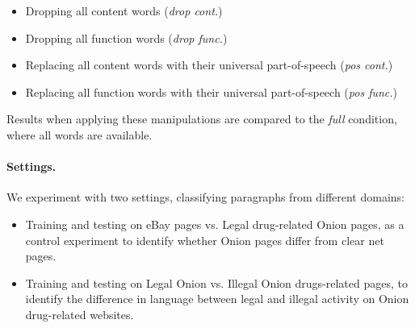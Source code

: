 \documentclass[11pt,a4paper,table]{article}
\begin{document}
\begin{itemize}
  \item Dropping all content words ({\it drop cont.})
  \item Dropping all function words ({\it drop func.})
  \item Replacing all content words with their universal part-of-speech ({\it pos cont.})
  \item Replacing all function words with their universal part-of-speech ({\it pos func.})
\end{itemize}

Results when applying these manipulations are compared to the {\it full} condition, where all
words are available.

\paragraph{Settings.}

We experiment with two settings, classifying paragraphs from different domains:
\begin{itemize}
  \item Training and testing on eBay pages vs. Legal drug-related Onion pages,
  as a control experiment
  to identify whether Onion pages differ from clear net pages.
  \item Training and testing on Legal Onion vs. Illegal Onion drugs-related pages,
  to identify the difference in language between legal and illegal activity
  on Onion drug-related websites.
  
\end{itemize}
\end{document}
